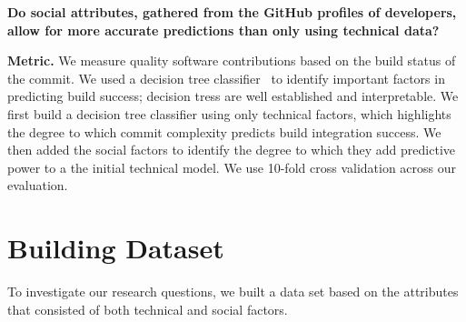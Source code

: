 \documentclass[10pt, conference]{IEEEtran}
\begin{document}
\textbf{Do social attributes, gathered 
from the GitHub profiles of developers,
allow for more accurate predictions than only using technical data?}

\begin{comment}
we have created a dataset with technical attributes to be able to analyze the 
predictive power of these attributes and its relationship with commit integration 
success. This way, we are able to create a model
We are afterwards interested in knowing if adding social attributes to this 
predictability model will increase the probability of the model asserting 
correctly future instances by knowing not only technical data about the commit 
being pushed but also social attributes of the developer pushing the changes.
\end{comment}

\vspace{1ex}
\noindent\textbf{Metric.} We measure quality software contributions based on the build status of the
commit. We used a decision tree classifier~\cite{Quinlan86} to identify
important factors in predicting build success;  decision tress are well
established  and interpretable. 
We first build a
decision tree classifier using only technical factors, which highlights
the degree to which commit complexity predicts build integration
success.  We then added the social factors to identify the degree to which they
add predictive power to a the initial technical model. 
We use 10-fold cross validation across our evaluation. 

\section{Building Dataset}
\label{approach}

To investigate our research questions, we built a data set based on the 
attributes that consisted of both technical and social factors. 
\end{document}
